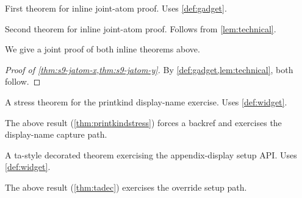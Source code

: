 \documentclass{article}
\begin{document}
\begin{theorem}\label{thm:s9-jatom-x}
First theorem for inline joint-atom proof.
Uses \cref{def:gadget}.
\end{theorem}

\begin{theorem}\label{thm:s9-jatom-y}
Second theorem for inline joint-atom proof.
Follows from \cref{lem:technical}.
\end{theorem}

We give a joint proof of both inline theorems above.

\begin{proof}[Proof of \cref{thm:s9-jatom-x,thm:s9-jatom-y}]
By \cref{def:gadget,lem:technical}, both follow.
\end{proof}

\begin{printkindstress}\label{thm:printkindstress}
A stress theorem for the printkind display-name exercise.
Uses \cref{def:widget}.
\end{printkindstress}

The above result (\cref{thm:printkindstress}) forces a backref
and exercises the display-name capture path.

\begin{tadec}\label{thm:tadec}
A ta-style decorated theorem exercising the appendix-display setup API.
Uses \cref{def:widget}.
\end{tadec}

The above result (\cref{thm:tadec}) exercises the override setup path.

\END
\end{document}
